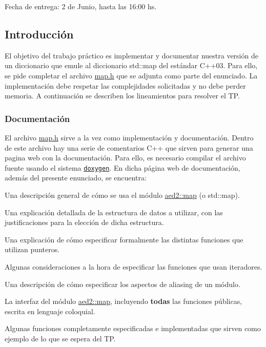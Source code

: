 
\begin{DoxyItemize}
\item Fecha de entrega\+: 2 de Junio, hasta las 16\+:00 hs.
\end{DoxyItemize}\hypertarget{Enunciado_intro-enunciado}{}\subsection{Introducción}\label{Enunciado_intro-enunciado}
El objetivo del trabajo práctico es implementar y documentar nuestra versión de un diccionario que emule al diccionario {\ttfamily std\+::map} del estándar C++03. Para ello, se pide completar el archivo {\ttfamily \hyperlink{map_8h}{map.\+h}} que se adjunta como parte del enunciado. La implementación debe respetar las complejidades solicitadas y no debe perder memoria. A continuación se describen los lineamientos para resolver el TP.\hypertarget{Enunciado_intro-doc}{}\subsubsection{Documentación}\label{Enunciado_intro-doc}
El archivo {\ttfamily \hyperlink{map_8h}{map.\+h}} sirve a la vez como implementación y documentación. Dentro de este archivo hay una serie de comentarios C++ que sirven para generar una pagina web con la documentación. Para ello, es necesario compilar el archivo fuente usando el sistema \href{http://www.doxygen.org}{\tt doxygen}. En dicha página web de documentación, además del presente enunciado, se encuentra\+:


\begin{DoxyItemize}
\item Una descripción general de cómo se usa el módulo {\ttfamily \hyperlink{classaed2_1_1map}{aed2\+::map}} (o {\ttfamily std\+::map}).
\item Una explicación detallada de la estructura de datos a utilizar, con las justificaciones para la elección de dicha estructura.
\item Una explicación de cómo especificar formalmente las distintas funciones que utilizan punteros.
\item Algunas consideraciones a la hora de especificar las funciones que usan iteradores.
\item Una descripción de cómo especificar los aspectos de aliasing de un módulo.
\item La interfaz del módulo {\ttfamily \hyperlink{classaed2_1_1map}{aed2\+::map}}, incluyendo {\bfseries todas} las funciones públicas, escrita en lenguaje coloquial.
\item Algunas funciones completamente especificadas e implementadas que sirven como ejemplo de lo que se espera del TP.
\end{DoxyItemize}

